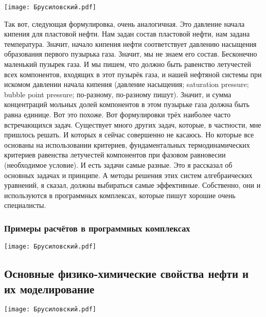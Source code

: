 \documentclass[main.tex]{subfiles}
\begin{document}
\begin{center}
\texttt{[image: Брусиловский.pdf]}
\end{center}

Так вот, следующая формулировка, очень аналогичная.
Это давление начала кипения для пластовой нефти.
Нам задан состав пластовой нефти, нам задана температура.
Значит, начало кипения нефти соответствует давлению насыщения образования первого пузырька газа.
Значит, мы не знаем его состав.
Бесконечно маленький пузырек газа.
И мы пишем, что должно быть равенство летучестей всех компонентов, входящих в этот пузырёк газа, и нашей нефтяной системы при искомом давлении начала кипения (давление насыщения; saturation pressure; bubble point pressure; по-разному, по-разному пишут).
Значит, и сумма концентраций мольных долей компонентов в этом пузырьке газа должна быть равна единице.
Вот это похоже.
Вот формулировки трёх наиболее часто встречающихся задач.
Существует много других задач, которые, в частности, мне пришлось решать.
И которых я сейчас совершенно не касаюсь.
Но которые все основаны на использовании критериев, фундаментальных термодинамических критериев равенства летучестей компонентов при фазовом равновесии (необходимое условие).
И есть задачи самые разные.
Это я рассказал об основных задачах и принципе.
А методы решения этих систем алгебраических уравнений, я сказал, должны выбираться самые эффективные.
Собственно, они и используются в программных комплексах, которые пишут хорошие очень специалисты.

\subsubsection{Примеры расчётов в программных комплексах}

\begin{center}
\texttt{[image: Брусиловский.pdf]}
\end{center}



\subsection[\underline{\textbf{Основные физико-химические свойства нефти и их моделирование}}]{Основные физико-химические свойства нефти и их моделирование}

\begin{center}
\texttt{[image: Брусиловский.pdf]}
\end{center}
\end{document}
